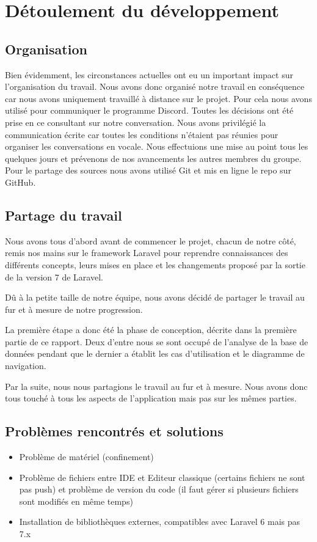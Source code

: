 \documentclass[12pt]{article}
\begin{document}
\newpage

\section{Détoulement du développement}

\subsection{Organisation}

Bien évidemment, les circonstances actuelles ont eu un important impact sur l'organisation du travail. Nous avons donc organisé notre travail en conséquence car nous avons uniquement travaillé à distance sur le projet. Pour cela nous avons utilisé pour communiquer le programme Discord. Toutes les décisions ont été prise en ce consultant sur notre conversation. Nous avons privilégié la communication écrite car toutes les conditions n'étaient pas réunies pour organiser les conversations en vocale. Nous effectuions une mise au point tous les quelques jours et prévenons de nos avancements les autres membres du groupe. Pour le partage des sources nous avons utilisé Git et mis en ligne le repo sur GitHub.

\subsection{Partage du travail}

Nous avons tous d'abord avant de commencer le projet, chacun de notre côté, remis nos mains sur le framework
Laravel pour reprendre connaissances des différents concepts, leurs mises en place et les changements proposé par la sortie de la version 7 de Laravel.

Dû à la petite taille de notre équipe, nous avons décidé de partager le travail au fur et à mesure de notre progression.

La première étape a donc été la phase de conception, décrite dans la première partie de ce rapport. Deux d'entre nous se sont occupé de l'analyse de la base de données pendant que le dernier a établit les cas d'utilisation et le diagramme  de navigation.

Par la suite, nous nous partagions le travail au fur et à mesure. Nous avons donc tous touché à tous les aspects de l'application mais pas sur les mêmes parties.

\subsection{Problèmes rencontrés et solutions}
\begin{itemize}
\item Problème de matériel (confinement)
\item Problème de fichiers entre IDE et Editeur classique (certains fichiers ne sont pas push) et problème de version du code (il faut gérer si plusieurs fichiers sont modifiés en même temps)
\item Installation de bibliothèques externes, compatibles avec Laravel 6 mais pas 7.x
\end{itemize}
\end{document}
